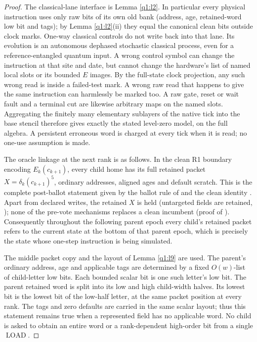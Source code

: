 \begin{proof}

The classical-lane interface is Lemma \ref{q1:l2}. In particular every physical instruction uses only raw bits of its own old bank (address, age, retained-word low bit and tags); by Lemma \ref{q1:l2}(ii) they equal the canonical clean bits outside clock marks. One-way classical controls do not write back into that lane. Its evolution is an autonomous dephased stochastic classical process, even for a reference-entangled quantum input. A wrong control symbol can change the instruction at that site and date, but cannot change the hardware's list of named local slots or its bounded \(E\) images. By the full-state clock projection, any such wrong read is inside a failed-test mark. A wrong raw read that happens to give the same instruction can harmlessly be marked too. A raw gate, reset or wait fault and a terminal cut are likewise arbitrary maps on the named slots. Aggregating the finitely many elementary sublayers of the native tick into the base stencil therefore gives exactly the stated level-zero model, on the full algebra. A persistent erroneous word is charged at every tick when it is read; no one-use assumption is made.

The oracle linkage at the next rank is as follows. In the clean R1 boundary encoding \(E_{k}(c_{k+1})\), every child home has its full retained packet \(X=\delta_{k}(c_{k+1})^{5}\), ordinary addresses, aligned ages and default scratch. This is the complete post-ballot statement given by the ballot rule of \cite[Section~\ref*{cl:sec:verifier}]{DMNoise1D2026} and the clean identity \cite[Lemma~\ref*{cl:lem:clean}]{DMNoise1D2026}. Apart from declared writes, the retained \(X\) is held (untargeted fields are retained, \cite[Section~\ref*{cl:sec:native}]{DMNoise1D2026}); none of the pre-vote mechanisms replaces a clean incumbent (proof of \cite[Lemma~\ref*{cl:lem:clean}]{DMNoise1D2026}). Consequently throughout the following parent epoch every child's retained packet refers to the current state at the bottom of that parent epoch, which is precisely the state whose one-step instruction is being simulated.

The middle packet copy and the layout of Lemma \ref{q1:l9} are used. The parent's ordinary address, age and applicable tags are determined by a fixed \(O(w)\)-list of child-letter low bits. Each bounded scalar bit is one such letter's low bit. The parent retained word is split into its low and high child-width halves. Its lowest bit is the lowest bit of the low-half letter, at the same packet position at every rank. The tags and zero defaults are carried in the same scalar layout; thus this statement remains true when a represented field has no applicable word. No child is asked to obtain an entire word or a rank-dependent high-order bit from a single \(\operatorname{LOAD}\).


\end{proof}
